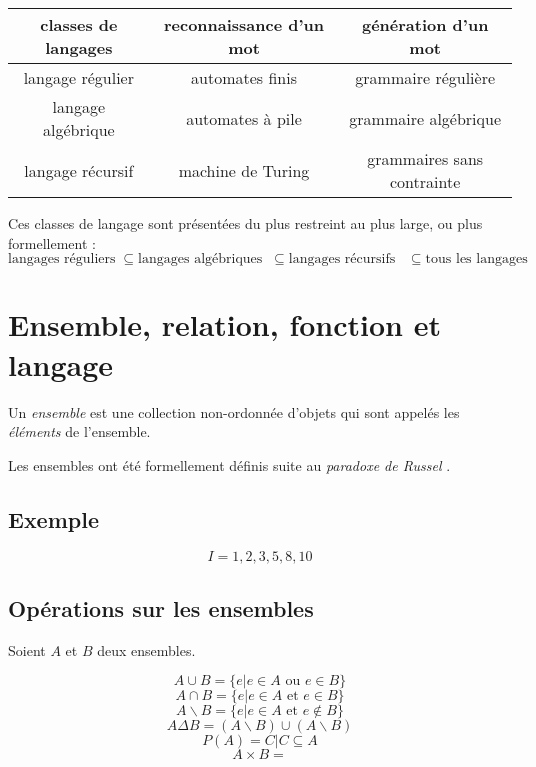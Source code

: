\documentclass[12pt, a4paper]{report}
\begin{document}
\begin{center}
\begin{tabular}{|c|c|c|}
\hline
classes de langages & reconnaissance d'un mot & génération d'un mot \\ \hline \hline
langage régulier  & automates finis & grammaire régulière \\ \hline
langage algébrique & automates à pile & grammaire algébrique \\ \hline
langage récursif & machine de Turing & grammaires sans contrainte \\
\hline
\end{tabular}
\end{center}

Ces classes de langage sont présentées du plus restreint au plus large, ou plus formellement :
\[
\text{langages réguliers}
\;\subseteq\text{langages algébriques}
\;\;\subseteq\text{langages récursifs}
\;\;\;\subseteq\text{tous les langages}
\]

\section{Ensemble, relation, fonction et langage}


Un \textit{ensemble} est une collection non-ordonnée d'objets qui sont appelés les \textit{éléments} de l'ensemble. 

Les ensembles ont été formellement définis suite au \textit{paradoxe de Russel} .

\subsection{Exemple}

\[
I = {1, 2, 3, 5, 8, 10}
\]


\subsection{Opérations sur les ensembles}

Soient $A$ et $B$ deux ensembles.

\[ A \cup B = \{ e | e \in A \textrm{ ou } e \in B \} \]
\[ A \cap B = \{ e | e \in A \textrm{ et } e \in B \} \]
\[ A \backslash B = \{ e | e \in A \textrm{ et } e \not\in B \} \]
\[ A \Delta B = (A \backslash B)\cup (A \backslash B) \]
\[ P(A) = { C | C \subseteq A} \]
\[ A \times B = \]
\end{document}
